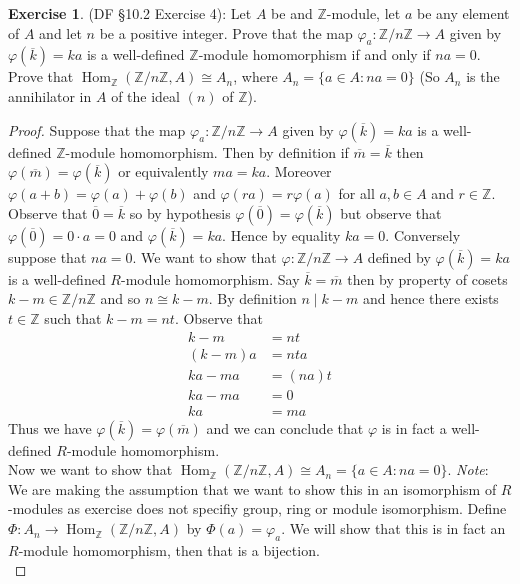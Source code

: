\documentclass[8pt]{amsart}
\theoremstyle{plain}%
\theoremstyle{definition}
\newtheorem*{exercise}{Exercise}%
\theoremstyle{remark}
\numberwithin{equation}{section}
\newcommand{\Z}{\mathbb{Z}}
\begin{document}
\begin{exercise}
(DF \S 10.2 Exercise 4): Let $A$ be and $\Z$-module, let $a$ be any element of $A$ and let $n$ be a positive integer. Prove that the map $\varphi_a : \Z/n\Z \to A$ given by $\varphi(\overline k) = ka$ is a well-defined $\mathbb Z$-module homomorphism if and only if $na = 0$. Prove that $\operatorname{Hom}_\Z(\Z/n\Z, A) \cong A_n$, where $A_n = \{a \in A : na = 0\}$ (So $A_n$ is the annihilator in $A$ of the ideal $(n)$ of $\Z$).
	\begin{proof}
		Suppose that the map $\varphi_a : \Z/n\Z \to A$ given by $\varphi(\overline k) = ka$ is a well-defined $\mathbb Z$-module homomorphism. Then by definition if $\overline m = \overline k$ then $\varphi(\overline m) = \varphi(\overline k)$ or equivalently $ma = ka$. Moreover $\varphi(a + b) = \varphi(a) + \varphi(b)$ and $\varphi(ra) = r\varphi(a)$ for all $a, b \in A$ and $r \in \Z$. Observe that $\overline 0 = \overline k$ so by hypothesis $\varphi(\overline 0) = \varphi(\overline k)$ but observe that $\varphi(\overline 0) = 0 \cdot a = 0$ and $\varphi(\overline k) = ka$. Hence by equality $ka = 0$. Conversely suppose that $na = 0$. We want to show that $\varphi : \Z/n\Z \to A$ defined by $\varphi(\overline k) = ka$ is a well-defined $R$-module homomorphism. Say $\overline k = \overline m$ then by property of cosets $k - m \in \Z/n\Z$ and so $n \cong k - m$. By definition $n \mid k - m$ and hence there exists $t \in \Z$ such that $k - m = nt$. Observe that
		\begin{align*}
			k - m &= nt\\
			(k - m)a &= nta\\
			ka - ma &= (na)t\\
			ka - ma &= 0\\
			ka &= ma 
		\end{align*}
		Thus we have $\varphi(\overline k) = \varphi(\overline m)$ and we can conclude that $\varphi$ is in fact a well-defined $R$-module homomorphism.\\

		Now we want to show that $\operatorname{Hom}_\Z(\Z/n\Z, A) \cong A_n = \{a \in A : na = 0\}$. \textit{Note}: We are making the assumption that we want to show this in an isomorphism of $R$-modules as exercise does not specifiy group, ring or module isomorphism. Define $\Phi : A_n \to \operatorname{Hom}_\Z(\Z/n\Z, A)$ by $\Phi(a) = \varphi_a$. We will show that this is in fact an $R$-module homomorphism, then that is a bijection.\\


\end{proof}
\end{exercise}
\end{document}
